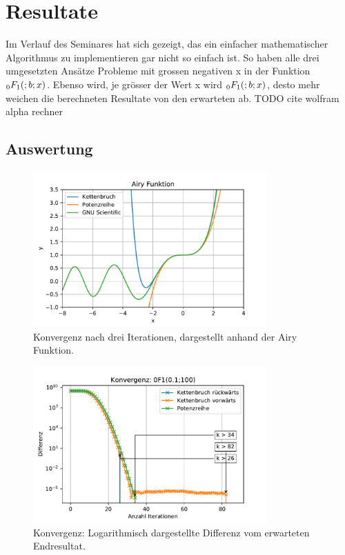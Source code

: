 %
%
%
\section{Resultate
\label{0f1:section:teil3}}
Im Verlauf des Seminares hat sich gezeigt, 
das ein einfacher mathematischer Algorithmus zu implementieren gar nicht so einfach ist.
So haben alle drei umgesetzten Ansätze Probleme mit grossen negativen x in der Funktion $\mathstrut_0F_1(;b;x)$.
Ebenso wird, je grösser der Wert x wird $\mathstrut_0F_1(;b;x)$, desto mehr weichen die berechneten Resultate
von den erwarteten ab. 
{\color{red}TODO cite wolfram alpha rechner}

\subsection{Auswertung
\label{0f1:subsection:auswertung}}
\begin{figure}
    \centering
    \includegraphics[width=0.8\textwidth]{papers/0f1/images/konvergenzAiry.pdf}
    \caption{Konvergenz nach drei Iterationen, dargestellt anhand der Airy Funktion.
    \label{0f1:ausblick:plot:airy:konvergenz}}
\end{figure}

\begin{figure}
    \centering
    \includegraphics[width=0.8\textwidth]{papers/0f1/images/konvergenzPositiv.pdf}
    \caption{Konvergenz: Logarithmisch dargestellte Differenz vom erwarteten Endresultat.
    \label{0f1:ausblick:plot:konvergenz:positiv}}
\end{figure}

